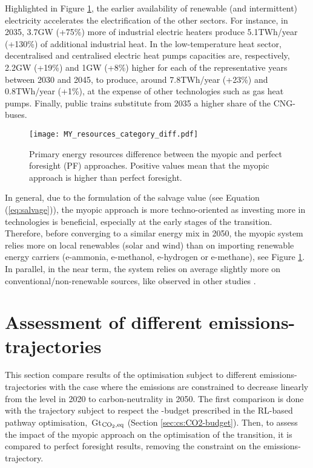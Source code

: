 Highlighted in Figure \ref{fig:my_pestd_res_cat_diff}, the earlier availability of renewable (and intermittent) electricity accelerates the electrification of the other sectors. For instance, in 2035, 3.7GW (+75\%) more of industrial electric heaters produce 5.1TWh/year (+130\%) of additional industrial heat. In the low-temperature heat sector, decentralised and centralised electric heat pumps capacities are, respectively, 2.2GW (+19\%) and 1GW (+8\%) higher for each of the representative years between 2030 and 2045, to produce, around 7.8TWh/year (+23\%) and 0.8TWh/year (+1\%), at the expense of other technologies such as gas heat pumps. Finally, public trains substitute from 2035 a higher share of the CNG-buses.

 \begin{figure}[!htbp]
\centering
\texttt{[image: MY\_resources\_category\_diff.pdf]}
\caption{Primary energy resources difference between the myopic and perfect foresight (PF) approaches. Positive values mean that the myopic approach is higher than perfect foresight.}
\label{fig:my_pestd_res_cat_diff}
\end{figure}

In general, due to the formulation of the salvage value (see Equation (\ref{eq:salvage})), the myopic approach is more techno-oriented as investing more in technologies is beneficial, especially at the early stages of the transition. Therefore, before converging to a similar energy mix in 2050, the myopic system relies more on local renewables (\eg solar and wind) than on importing renewable energy carriers (\eg e-ammonia, e-methanol, e-hydrogen or e-methane), see Figure \ref{fig:my_pestd_res_cat_diff}. In parallel, in the near term, the system relies on average slightly more on conventional/non-renewable sources, like observed in other studies \cite{keppo2010short,nyqvist2005limited,hedenus2006induced}.


\section{Assessment of different emissions-trajectories}
\label{app:CO2_trajectories}
This section compare results of the optimisation subject to different emissions-trajectories with the case where the emissions are constrained to decrease linearly from the level in 2020 to carbon-neutrality in 2050. The first comparison is done with the trajectory subject to respect the -budget prescribed in the \gls{RL}-based pathway optimisation, \,Gt$_{\ce{CO2},\text{eq}}$ (Section \ref{sec:cs:CO2-budget}). Then, to assess the impact of the myopic approach on the optimisation of the transition, it is compared to perfect foresight results, removing the constraint on the emissions-trajectory.



